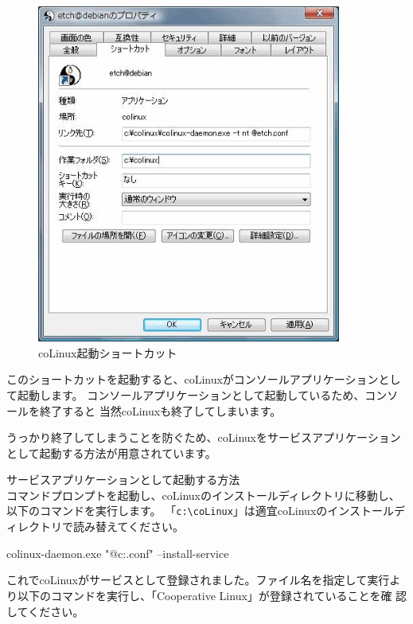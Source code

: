 \documentclass[mingoth,a4paper]{jsarticle}
\begin{document}
\begin{figure}[htbp]
 \begin{center}
  \includegraphics[width=100mm]{image200804/colinux_shortcut.png}
 \end{center}
 \caption{coLinux起動ショートカット}
 \label{fig:shortcut}
\end{figure}

このショートカットを起動すると、coLinuxがコンソールアプリケーションとして起動します。
コンソールアプリケーションとして起動しているため、コンソールを終了すると
当然coLinuxも終了してしまいます。

うっかり終了してしまうことを防ぐため、coLinuxをサービスアプリケーション
として起動する方法が用意されています。

サービスアプリケーションとして起動する方法\\
コマンドプロンプトを起動し、coLinuxのインストールディレクトリに移動し、
以下のコマンドを実行します。
「\verb|c:\coLinux|」は適宜coLinuxのインストールディレクトリで読み替えてください。
\begin{commandline}
colinux-daemon.exe "@c:\coLinux\etch.conf" --install-service
\end{commandline}

これでcoLinuxがサービスとして登録されました。ファイル名を指定して実行よ
り以下のコマンドを実行し、「Cooperative Linux」が登録されていることを確
認してください。
\begin{commandline}
\end{commandline}
\end{document}
